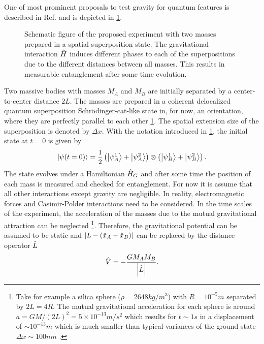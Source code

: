 One of most prominent proposals to test gravity for quantum features is described in Ref. \cite{Bose_2017} and is depicted in \cref{fig:2:simple-problem}.
\begin{figure}[!htbp]
  \centering
  \def\svgwidth{\textwidth}
  
  \caption{Schematic figure of the proposed experiment with two masses prepared in a spatial superposition state. The gravitational interaction $\hat{H}$ induces different phases to each of the superpositions due to the different distances between all masses. This results in measurable entanglement after some time evolution.}
  \label{fig:2:simple-problem}
\end{figure}
Two massive bodies with masses $M_A$ and $M_B$ are initially separated by a center-to-center distance $2L$. 
The masses are prepared in a coherent delocalized quantum superposition Schrödinger-cat-like state in, for now, an orientation, where they are perfectly parallel to each other \cref{fig:2:simple-problem}.
The spatial extension size of the superposition is denoted by $\Delta x$.
With the notation introduced in \cref{fig:2:simple-problem}, the initial state at $t=0$ is given by
\begin{equation}\label{eq:2:initial-state}
  \ket{\psi(t=0)} = \frac{1}{2}\left( \ket{\psi_A^1} + \ket{\psi_A^2} \right) \otimes \left( \ket{\psi_B^1} + \ket{\psi_B^2} \right) .
\end{equation}
The state evolves under a Hamiltonian $\hat{H}_G$ and after some time the position of each mass is measured and checked for entanglement.
For now it is assume that all other interactions except gravity are negligible. In reality, electromagnetic forces and Casimir-Polder interactions \cite{Casimir_1948, Casimir_1948a} need to be considered.
In the time scales of the experiment, the acceleration of the masses due to the mutual gravitational attraction can be neglected \footnote{Take for example a silica sphere ($\rho = 2648 \si{kg/m^3}$) with $R=10^{-5}\si{m}$ separated by $2L=4R$. The mutual gravitational acceleration for each sphere is around $a=GM/(2L)^2 = 5 \times 10^{-13}\si{m/s^2}$ which results for $t\sim 1 \si{s}$ in a displacement of $\sim 10^{-13}\si{m}$ which is much smaller than typical variances of the ground state $\Delta x \sim 100\si{nm}$ \cite{Fein_2019}.}.
Therefore, the gravitational potential can be assumed to be static and $\left\lvert L-(\hat{x}_A - \hat{x}_B)\right\rvert$ can be replaced by the distance operator $\hat{L}$
\begin{equation}\label{eq:2:newtonian-potential}
  \hat{V} = -\frac{G M_A M_B}{\left\lvert\hat{L}\right\rvert} .
\end{equation}
